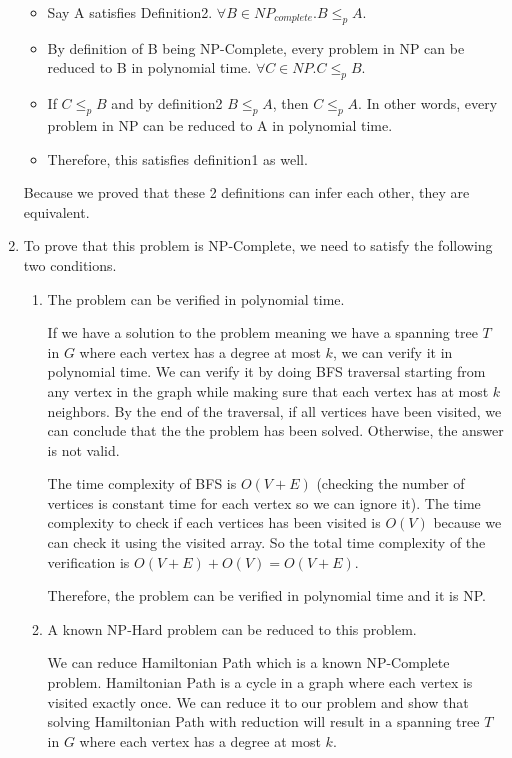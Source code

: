 \documentclass{article}
\begin{document}
\begin{enumerate}
    \begin{itemize}
        \item Say A satisfies Definition2. $\forall B\in NP_{complete}.B\leq_pA$.
        \item By definition of B being NP-Complete, every problem in NP can be reduced to B in polynomial time. $\forall C\in NP.C\leq_p B$.
        \item If $C\leq_p B$ and by definition2 $B\leq_p A$, then $C\leq_p A$.
        In other words, every problem in NP can be reduced to A in polynomial time.
        \item Therefore, this satisfies definition1 as well.
    \end{itemize}

    Because we proved that these 2 definitions can infer each other, they are equivalent.
    
    \item To prove that this problem is NP-Complete, we need to satisfy the following two conditions.

    \begin{enumerate}
        \item The problem can be verified in polynomial time.

        If we have a solution to the problem meaning we have a spanning tree $T$ in $G$ where each vertex has a degree at most $k$, we can verify it in polynomial time.
        We can verify it by doing BFS traversal starting from any vertex in the graph while making sure that each vertex has at most $k$ neighbors.
        By the end of the traversal, if all vertices have been visited, we can conclude that the the problem has been solved.
        Otherwise, the answer is not valid.

        The time complexity of BFS is $O(V+E)$ (checking the number of vertices is constant time for each vertex so we can ignore it).
        The time complexity to check if each vertices has been visited is $O(V)$ because we can check it using the visited array.
        So the total time complexity of the verification is $O(V+E)+O(V)=O(V+E)$.

        Therefore, the problem can be verified in polynomial time and it is NP.

        \item A known NP-Hard problem can be reduced to this problem.

        We can reduce Hamiltonian Path which is a known NP-Complete problem.
        Hamiltonian Path is a cycle in a graph where each vertex is visited exactly once.
        We can reduce it to our problem and show that solving Hamiltonian Path with reduction will result in a spanning tree $T$ in $G$ where each vertex has a degree at most $k$.


\end{enumerate}
\end{enumerate}
\end{document}
